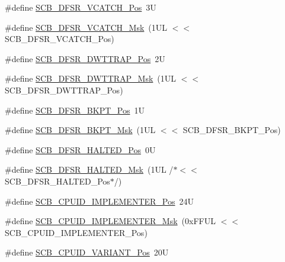 \begin{DoxyCompactItemize}
\item 
\#define \hyperlink{group___c_m_s_i_s___s_c_b_gad02d3eaf062ac184c18a7889c9b6de57}{S\-C\-B\-\_\-\-D\-F\-S\-R\-\_\-\-V\-C\-A\-T\-C\-H\-\_\-\-Pos}~3\-U
\item 
\#define \hyperlink{group___c_m_s_i_s___s_c_b_gacbb931575c07b324ec793775b7c44d05}{S\-C\-B\-\_\-\-D\-F\-S\-R\-\_\-\-V\-C\-A\-T\-C\-H\-\_\-\-Msk}~(1\-U\-L $<$$<$ S\-C\-B\-\_\-\-D\-F\-S\-R\-\_\-\-V\-C\-A\-T\-C\-H\-\_\-\-Pos)
\item 
\#define \hyperlink{group___c_m_s_i_s___s_c_b_gaccf82364c6d0ed7206f1084277b7cc61}{S\-C\-B\-\_\-\-D\-F\-S\-R\-\_\-\-D\-W\-T\-T\-R\-A\-P\-\_\-\-Pos}~2\-U
\item 
\#define \hyperlink{group___c_m_s_i_s___s_c_b_ga3f7384b8a761704655fd45396a305663}{S\-C\-B\-\_\-\-D\-F\-S\-R\-\_\-\-D\-W\-T\-T\-R\-A\-P\-\_\-\-Msk}~(1\-U\-L $<$$<$ S\-C\-B\-\_\-\-D\-F\-S\-R\-\_\-\-D\-W\-T\-T\-R\-A\-P\-\_\-\-Pos)
\item 
\#define \hyperlink{group___c_m_s_i_s___s_c_b_gaf28fdce48655f0dcefb383aebf26b050}{S\-C\-B\-\_\-\-D\-F\-S\-R\-\_\-\-B\-K\-P\-T\-\_\-\-Pos}~1\-U
\item 
\#define \hyperlink{group___c_m_s_i_s___s_c_b_ga609edf8f50bc49adb51ae28bcecefe1f}{S\-C\-B\-\_\-\-D\-F\-S\-R\-\_\-\-B\-K\-P\-T\-\_\-\-Msk}~(1\-U\-L $<$$<$ S\-C\-B\-\_\-\-D\-F\-S\-R\-\_\-\-B\-K\-P\-T\-\_\-\-Pos)
\item 
\#define \hyperlink{group___c_m_s_i_s___s_c_b_gaef4ec28427f9f88ac70a13ae4e541378}{S\-C\-B\-\_\-\-D\-F\-S\-R\-\_\-\-H\-A\-L\-T\-E\-D\-\_\-\-Pos}~0\-U
\item 
\#define \hyperlink{group___c_m_s_i_s___s_c_b_ga200bcf918d57443b5e29e8ce552e4bdf}{S\-C\-B\-\_\-\-D\-F\-S\-R\-\_\-\-H\-A\-L\-T\-E\-D\-\_\-\-Msk}~(1\-U\-L /$\ast$$<$$<$ S\-C\-B\-\_\-\-D\-F\-S\-R\-\_\-\-H\-A\-L\-T\-E\-D\-\_\-\-Pos$\ast$/)
\item 
\#define \hyperlink{group___c_m_s_i_s___s_c_b_ga58686b88f94f789d4e6f429fe1ff58cf}{S\-C\-B\-\_\-\-C\-P\-U\-I\-D\-\_\-\-I\-M\-P\-L\-E\-M\-E\-N\-T\-E\-R\-\_\-\-Pos}~24\-U
\item 
\#define \hyperlink{group___c_m_s_i_s___s_c_b_ga0932b31faafd47656a03ced75a31d99b}{S\-C\-B\-\_\-\-C\-P\-U\-I\-D\-\_\-\-I\-M\-P\-L\-E\-M\-E\-N\-T\-E\-R\-\_\-\-Msk}~(0x\-F\-F\-U\-L $<$$<$ S\-C\-B\-\_\-\-C\-P\-U\-I\-D\-\_\-\-I\-M\-P\-L\-E\-M\-E\-N\-T\-E\-R\-\_\-\-Pos)
\item 
\#define \hyperlink{group___c_m_s_i_s___s_c_b_ga104462bd0815391b4044a70bd15d3a71}{S\-C\-B\-\_\-\-C\-P\-U\-I\-D\-\_\-\-V\-A\-R\-I\-A\-N\-T\-\_\-\-Pos}~20\-U
\item 

\end{DoxyCompactItemize}
